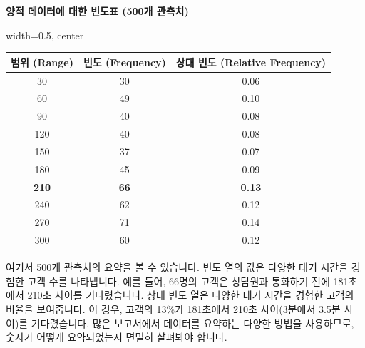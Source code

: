 \documentclass[11pt,a4paper]{book}
\providecommand{\captionof}[2]{\textbf{#2}}
\theoremstyle{definition}
\begin{document}
\begin{tcolorbox}[title={양적 데이터에 대한 빈도표 (Frequency Table for Quantitative Data)}]
\begin{center}
\captionof{table}{양적 데이터에 대한 빈도표 (500개 관측치)}
\label{tab:quantitative_frequency_table}
\begin{adjustbox}{width=0.5\textwidth, center}
\begin{tabular}{ccc}
\toprule
\textbf{범위 (Range)} & \textbf{빈도 (Frequency)} & \textbf{상대 빈도 (Relative Frequency)} \\
\midrule
30 & 30 & 0.06 \\
60 & 49 & 0.10 \\
90 & 40 & 0.08 \\
120 & 40 & 0.08 \\
150 & 37 & 0.07 \\
180 & 45 & 0.09 \\
\textbf{210} & \textbf{66} & \textbf{0.13} \\ %
240 & 62 & 0.12 \\
270 & 71 & 0.14 \\
300 & 60 & 0.12 \\
\bottomrule
\end{tabular}
\end{adjustbox}
\end{center}
여기서 500개 관측치의 요약을 볼 수 있습니다. 빈도 열의 값은 다양한 대기 시간을 경험한 고객 수를 나타냅니다. 예를 들어, 66명의 고객은 상담원과 통화하기 전에 181초에서 210초 사이를 기다렸습니다. 상대 빈도 열은 다양한 대기 시간을 경험한 고객의 비율을 보여줍니다. 이 경우, 고객의 13\%가 181초에서 210초 사이(3분에서 3.5분 사이)를 기다렸습니다. 많은 보고서에서 데이터를 요약하는 다양한 방법을 사용하므로, 숫자가 어떻게 요약되었는지 면밀히 살펴봐야 합니다.
\end{tcolorbox}
\end{document}
